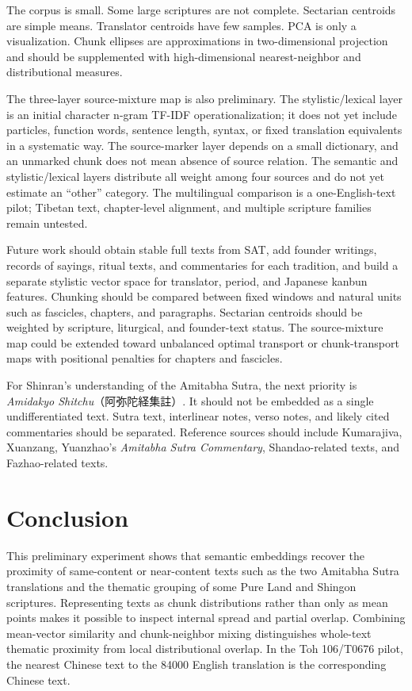 \documentclass[uplatex,dvipdfmx,11pt,a4paper]{jsarticle}
\begin{document}
The corpus is small. Some large scriptures are not complete. Sectarian centroids are simple means. Translator centroids have few samples. PCA is only a visualization. Chunk ellipses are approximations in two-dimensional projection and should be supplemented with high-dimensional nearest-neighbor and distributional measures.

The three-layer source-mixture map is also preliminary. The stylistic/lexical layer is an initial character n-gram TF-IDF operationalization; it does not yet include particles, function words, sentence length, syntax, or fixed translation equivalents in a systematic way. The source-marker layer depends on a small dictionary, and an unmarked chunk does not mean absence of source relation. The semantic and stylistic/lexical layers distribute all weight among four sources and do not yet estimate an ``other'' category. The multilingual comparison is a one-English-text pilot; Tibetan text, chapter-level alignment, and multiple scripture families remain untested.

Future work should obtain stable full texts from SAT, add founder writings, records of sayings, ritual texts, and commentaries for each tradition, and build a separate stylistic vector space for translator, period, and Japanese kanbun features. Chunking should be compared between fixed windows and natural units such as fascicles, chapters, and paragraphs. Sectarian centroids should be weighted by scripture, liturgical, and founder-text status. The source-mixture map could be extended toward unbalanced optimal transport or chunk-transport maps with positional penalties for chapters and fascicles.

For Shinran's understanding of the Amitabha Sutra, the next priority is \textit{Amidakyo Shitchu}（阿弥陀経集註）. It should not be embedded as a single undifferentiated text. Sutra text, interlinear notes, verso notes, and likely cited commentaries should be separated. Reference sources should include Kumarajiva, Xuanzang, Yuanzhao's \textit{Amitabha Sutra Commentary}, Shandao-related texts, and Fazhao-related texts.

\section{Conclusion}

This preliminary experiment shows that semantic embeddings recover the proximity of same-content or near-content texts such as the two Amitabha Sutra translations and the thematic grouping of some Pure Land and Shingon scriptures. Representing texts as chunk distributions rather than only as mean points makes it possible to inspect internal spread and partial overlap. Combining mean-vector similarity and chunk-neighbor mixing distinguishes whole-text thematic proximity from local distributional overlap. In the Toh 106/T0676 pilot, the nearest Chinese text to the 84000 English translation is the corresponding Chinese text.
\end{document}
